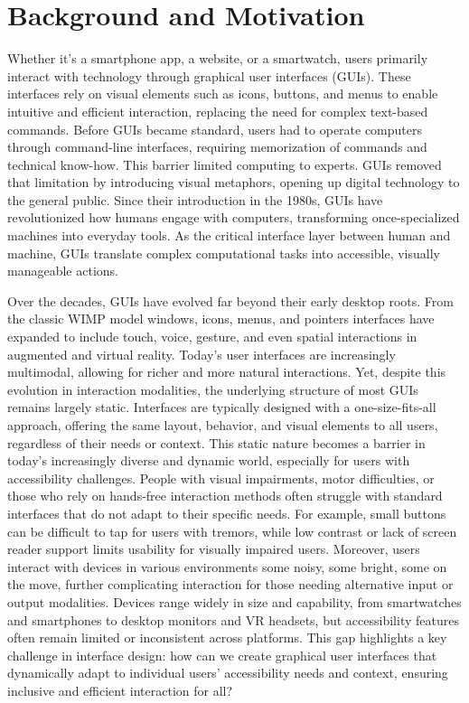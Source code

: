 \documentclass[openany]{book}
\begin{document}
\section{Background and Motivation}
Whether it's a smartphone app, a website, or a smartwatch, users primarily interact with technology through graphical user interfaces (GUIs). These interfaces rely on visual elements such as icons, buttons, and menus to enable intuitive and efficient interaction, replacing the need for complex text-based commands.
Before GUIs became standard, users had to operate computers through command-line interfaces, requiring memorization of commands and technical know-how. This barrier limited computing to experts. GUIs removed that limitation by introducing visual metaphors, opening up digital technology to the general public.
Since their introduction in the 1980s, GUIs have revolutionized how humans engage with computers, transforming once-specialized machines into everyday tools. As the critical interface layer between human and machine, GUIs translate complex computational tasks into accessible, visually manageable actions.

Over the decades, GUIs have evolved far beyond their early desktop roots. From the classic WIMP model windows, icons, menus, and pointers interfaces have expanded to include touch, voice, gesture, and even spatial interactions in augmented and virtual reality. Today’s user interfaces are increasingly multimodal, allowing for richer and more natural interactions.
Yet, despite this evolution in interaction modalities, the underlying structure of most GUIs remains largely static. Interfaces are typically designed with a one-size-fits-all approach, offering the same layout, behavior, and visual elements to all users, regardless of their needs or context. This static nature becomes a barrier in today’s increasingly diverse and dynamic world, especially for users with accessibility challenges. People with visual impairments, motor difficulties, or those who rely on hands-free interaction methods often struggle with standard interfaces that do not adapt to their specific needs. 
For example, small buttons can be difficult to tap for users with tremors, while low contrast or lack of screen reader support limits usability for visually impaired users.
Moreover, users interact with devices in various environments some noisy, some bright, some on the move, further complicating interaction for those needing alternative input or output modalities. Devices range widely in size and capability, from smartwatches and smartphones to desktop monitors and VR headsets, but accessibility features often remain limited or inconsistent across platforms. This gap highlights a key challenge in interface design: how can we create graphical user interfaces that dynamically adapt to individual users’ accessibility needs and context, ensuring inclusive and efficient interaction for all?
\end{document}
